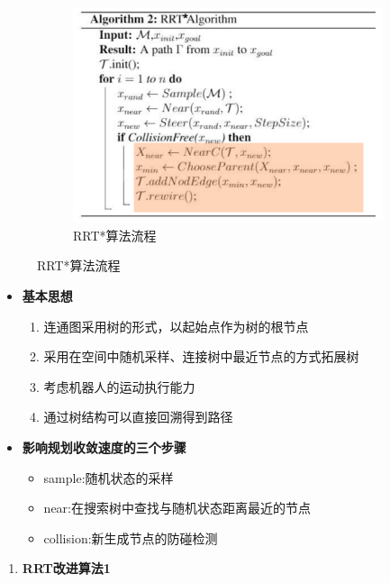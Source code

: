 \documentclass[../main.tex]{subfiles}
\begin{document}
\begin{enumerate}
\begin{figure}[H]
\begin{subfigure}[b]{0.50\textwidth}
                \centering
                \includegraphics[width=\linewidth]{images/rrts.png}
                \caption{RRT*算法流程}
            \end{subfigure}
        \end{figure}
        \begin{itemize}
            \item \textbf{基本思想}
                \begin{enumerate}
                    \item 连通图采用树的形式，以起始点作为树的根节点
                    \item 采用在空间中随机采样、连接树中最近节点的方式拓展树
                    \item 考虑机器人的运动执行能力
                    \item 通过树结构可以直接回溯得到路径
                \end{enumerate}
            \item \textbf{影响规划收敛速度的三个步骤}
                \begin{itemize}
                    \item sample:随机状态的采样
                    \item near:在搜索树中查找与随机状态距离最近的节点
                    \item collision:新生成节点的防碰检测
                \end{itemize}
        \end{itemize}
        \begin{enumerate}
            \item \textbf{RRT改进算法1}\label{item:prob:rrt:improv1}

\end{enumerate}
\end{enumerate}
\end{document}
